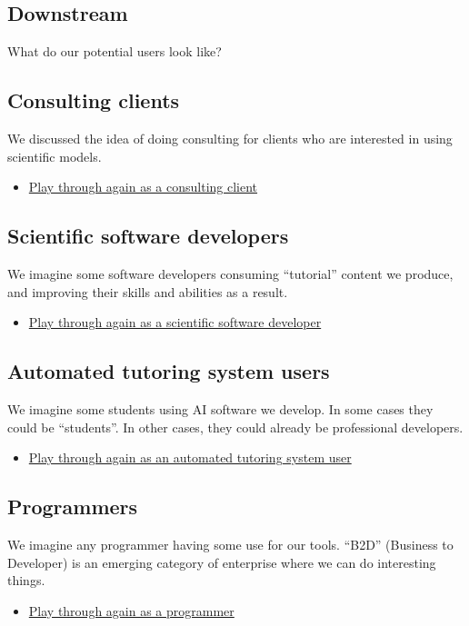 \documentclass[11pt]{article}
\begin{document}
\subsection{Downstream}
\label{sec:orgdc2d4c7}
What do our potential users look like?
\subsection{Consulting clients}
\label{sec:orgb08566c}
We discussed the idea of doing consulting for clients who are
interested in using scientific models.

\begin{itemize}
\item \href{0caba40b-2561-4143-b2b1-55f3ddc3201b}{Play through again as a consulting client}
\end{itemize}
\subsection{Scientific software developers}
\label{sec:org5c7d9f8}
We imagine some software developers consuming “tutorial” content we
produce, and improving their skills and abilities as a result.

\begin{itemize}
\item \href{0caba40b-2561-4143-b2b1-55f3ddc3201b}{Play through again as a scientific software developer}
\end{itemize}
\subsection{Automated tutoring system users}
\label{sec:orgc5d8e6e}
We imagine some students using AI software we develop.  In some cases
they could be “students”.  In other cases, they could already be
professional developers.

\begin{itemize}
\item \href{0caba40b-2561-4143-b2b1-55f3ddc3201b}{Play through again as an automated tutoring system user}
\end{itemize}
\subsection{Programmers}
\label{sec:orgb6761a8}
We imagine any programmer having some use for our tools.  “B2D”
(Business to Developer) is an emerging category of enterprise where we
can do interesting things.

\begin{itemize}
\item \href{0caba40b-2561-4143-b2b1-55f3ddc3201b}{Play through again as a programmer}
\end{itemize}
\end{document}

